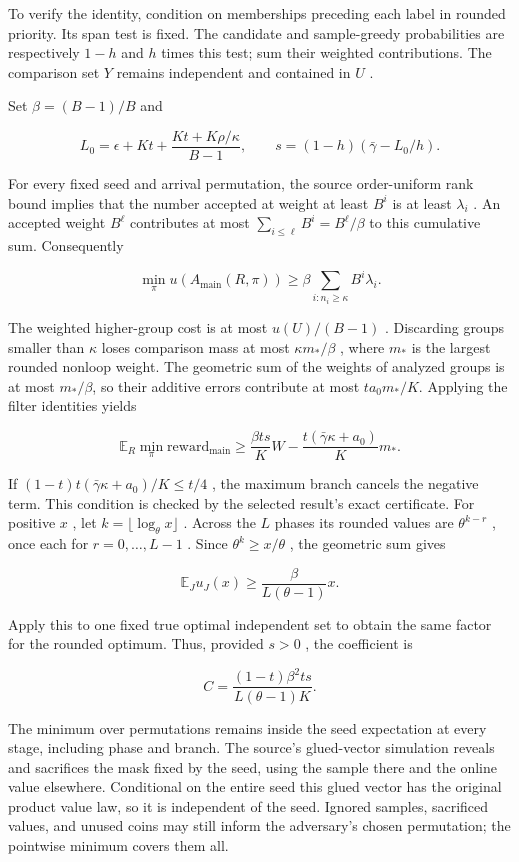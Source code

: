 \documentclass[11pt]{article}
\begin{document}
To verify the identity, condition on memberships preceding each label in rounded priority. Its span test is fixed. The candidate and sample-greedy probabilities are respectively \(1-h\) and \(h\) times this test; sum their weighted contributions. The comparison set \(Y\) remains independent and contained in \(U\) .

Set \(\beta=(B-1)/B\) and

\[L_0=\epsilon+Kt+\frac{Kt+K\rho/\kappa}{B-1},\qquad
s=(1-h)(\bar\gamma-L_0/h).\]

For every fixed seed and arrival permutation, the source order-uniform rank bound implies that the number accepted at weight at least \(B^i\) is at least \(\lambda_i\) . An accepted weight \(B^\ell\) contributes at most \(\sum_{i\le\ell}B^i=B^\ell/\beta\) to this cumulative sum. Consequently

\[\min_\pi u(A_{\mathrm{main}}(R,\pi))
\ge\beta\sum_{i:n_i\ge\kappa}B^i\lambda_i.\]

The weighted higher-group cost is at most \(u(U)/(B-1)\) . Discarding groups smaller than \(\kappa\) loses comparison mass at most \(\kappa m_*/\beta\) , where \(m_*\) is the largest rounded nonloop weight. The geometric sum of the weights of analyzed groups is at most \(m_*/\beta\), so their additive errors contribute at most \(t a_0m_*/K\). Applying the filter identities yields

\[\mathbb E_R\min_\pi\mathrm{reward}_{\mathrm{main}}
\ge\frac{\beta t s}{K}W-\frac{t(\bar\gamma\kappa+a_0)}{K}m_*.\]

If \((1-t)t(\bar\gamma\kappa+a_0)/K\le t/4\) , the maximum branch cancels the negative term. This condition is checked by the selected result's exact certificate. For positive \(x\) , let \(k=\lfloor\log_\theta x\rfloor\) . Across the \(L\) phases its rounded values are \(\theta^{k-r}\) , once each for \(r=0,\ldots,L-1\) . Since \(\theta^k\ge x/\theta\) , the geometric sum gives

\[\mathbb E_Ju_J(x)\ge\frac{\beta}{L(\theta-1)}x.\]

Apply this to one fixed true optimal independent set to obtain the same factor for the rounded optimum. Thus, provided \(s>0\) , the coefficient is

\[C=\frac{(1-t)\beta^2 t s}{L(\theta-1)K}.\]

The minimum over permutations remains inside the seed expectation at every stage, including phase and branch. The source's glued-vector simulation reveals and sacrifices the mask fixed by the seed, using the sample there and the online value elsewhere. Conditional on the entire seed this glued vector has the original product value law, so it is independent of the seed. Ignored samples, sacrificed values, and unused coins may still inform the adversary's chosen permutation; the pointwise minimum covers them all.
\end{document}
